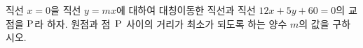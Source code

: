 직선 $x=0$을 직선 $y=mx$에 대하여 대칭이동한 직선과 직선 $12x+5y+60=0$의 교점을 $\mathrm{P}$라 하자. 원점과 점~$\mathrm{P}$ 사이의 거리가 최소가 되도록 하는 양수 $m$의 값을 구하시오.
